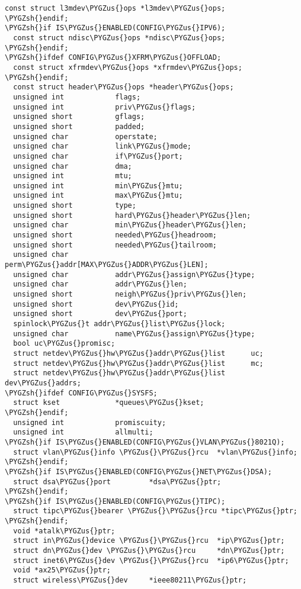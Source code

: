 \documentclass[a4paper,8pt,english]{sphinxmanual}
\def\PYGZus{\char`\_}
\def\PYGZsh{\char`\#}
\begin{document}
\begin{Verbatim}[commandchars=\\\{\}]
  const struct l3mdev\PYGZus{}ops *l3mdev\PYGZus{}ops;
\PYGZsh{}endif;
\PYGZsh{}if IS\PYGZus{}ENABLED(CONFIG\PYGZus{}IPV6);
  const struct ndisc\PYGZus{}ops *ndisc\PYGZus{}ops;
\PYGZsh{}endif;
\PYGZsh{}ifdef CONFIG\PYGZus{}XFRM\PYGZus{}OFFLOAD;
  const struct xfrmdev\PYGZus{}ops *xfrmdev\PYGZus{}ops;
\PYGZsh{}endif;
  const struct header\PYGZus{}ops *header\PYGZus{}ops;
  unsigned int            flags;
  unsigned int            priv\PYGZus{}flags;
  unsigned short          gflags;
  unsigned short          padded;
  unsigned char           operstate;
  unsigned char           link\PYGZus{}mode;
  unsigned char           if\PYGZus{}port;
  unsigned char           dma;
  unsigned int            mtu;
  unsigned int            min\PYGZus{}mtu;
  unsigned int            max\PYGZus{}mtu;
  unsigned short          type;
  unsigned short          hard\PYGZus{}header\PYGZus{}len;
  unsigned char           min\PYGZus{}header\PYGZus{}len;
  unsigned short          needed\PYGZus{}headroom;
  unsigned short          needed\PYGZus{}tailroom;
  unsigned char           perm\PYGZus{}addr[MAX\PYGZus{}ADDR\PYGZus{}LEN];
  unsigned char           addr\PYGZus{}assign\PYGZus{}type;
  unsigned char           addr\PYGZus{}len;
  unsigned short          neigh\PYGZus{}priv\PYGZus{}len;
  unsigned short          dev\PYGZus{}id;
  unsigned short          dev\PYGZus{}port;
  spinlock\PYGZus{}t addr\PYGZus{}list\PYGZus{}lock;
  unsigned char           name\PYGZus{}assign\PYGZus{}type;
  bool uc\PYGZus{}promisc;
  struct netdev\PYGZus{}hw\PYGZus{}addr\PYGZus{}list      uc;
  struct netdev\PYGZus{}hw\PYGZus{}addr\PYGZus{}list      mc;
  struct netdev\PYGZus{}hw\PYGZus{}addr\PYGZus{}list      dev\PYGZus{}addrs;
\PYGZsh{}ifdef CONFIG\PYGZus{}SYSFS;
  struct kset             *queues\PYGZus{}kset;
\PYGZsh{}endif;
  unsigned int            promiscuity;
  unsigned int            allmulti;
\PYGZsh{}if IS\PYGZus{}ENABLED(CONFIG\PYGZus{}VLAN\PYGZus{}8021Q);
  struct vlan\PYGZus{}info \PYGZus{}\PYGZus{}rcu  *vlan\PYGZus{}info;
\PYGZsh{}endif;
\PYGZsh{}if IS\PYGZus{}ENABLED(CONFIG\PYGZus{}NET\PYGZus{}DSA);
  struct dsa\PYGZus{}port         *dsa\PYGZus{}ptr;
\PYGZsh{}endif;
\PYGZsh{}if IS\PYGZus{}ENABLED(CONFIG\PYGZus{}TIPC);
  struct tipc\PYGZus{}bearer \PYGZus{}\PYGZus{}rcu *tipc\PYGZus{}ptr;
\PYGZsh{}endif;
  void *atalk\PYGZus{}ptr;
  struct in\PYGZus{}device \PYGZus{}\PYGZus{}rcu  *ip\PYGZus{}ptr;
  struct dn\PYGZus{}dev \PYGZus{}\PYGZus{}rcu     *dn\PYGZus{}ptr;
  struct inet6\PYGZus{}dev \PYGZus{}\PYGZus{}rcu  *ip6\PYGZus{}ptr;
  void *ax25\PYGZus{}ptr;
  struct wireless\PYGZus{}dev     *ieee80211\PYGZus{}ptr;

\end{Verbatim}
\end{document}
